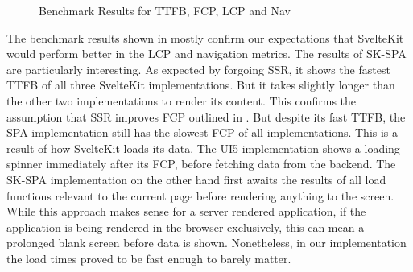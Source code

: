\begin{figure}
    \centering
    \caption{Benchmark Results for TTFB, FCP, LCP and Nav}
    \label{fig:benchmark}
\end{figure}

The benchmark results shown in  mostly confirm our expectations that SvelteKit would perform better in the LCP and navigation metrics. The results of SK-SPA are particularly interesting. As expected by forgoing SSR, it shows the fastest TTFB of all three SvelteKit implementations. But it takes slightly longer than the other two implementations to render its content. This confirms the assumption that SSR improves FCP outlined in . But despite its fast TTFB, the SPA implementation still has the slowest FCP of all implementations. This is a result of how SvelteKit loads its data. The UI5 implementation shows a loading spinner immediately after its FCP, before fetching data from the backend. The SK-SPA implementation on the other hand first awaits the results of all load functions relevant to the current page before rendering anything to the screen. While this approach makes sense for a server rendered application, if the application is being rendered in the browser exclusively, this can mean a prolonged blank screen before data is shown. Nonetheless, in our implementation the load times proved to be fast enough to barely matter. 

